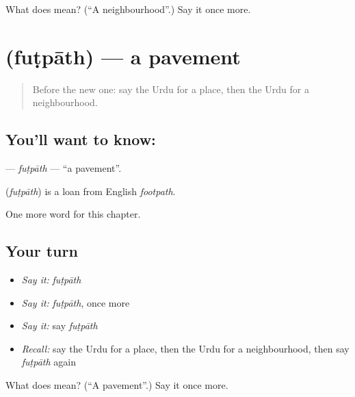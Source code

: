 \begin{tcolorbox}[breakable,colback=teal!4,colframe=teal!35!black,title={Before you move on}]
What does  mean? (\textquotedblleft{}A neighbourhood\textquotedblright{}.) Say it once more.
\end{tcolorbox}
\section[\texorpdfstring{\ur{فٹ} \ur{پاتھ} (fuṭpāth)}{فٹ پاتھ (fuṭpāth)}]{  (fuṭpāth) — a pavement}

\label{lesson:UR-C157-futpath}



\begin{quote}
Before the new one: say the Urdu for a place, then the Urdu for a neighbourhood.
\end{quote}

\subsection*{You'll want to know:  }
\textbf{ } — \emph{fuṭpāth} — \textquotedblleft{}a pavement\textquotedblright{}.

\begin{cousinweb}
\textbf{ } (\emph{fuṭpāth}) is a loan from English \emph{footpath}.
\end{cousinweb}

\begin{grammarlens}[title={What you've built}]
One more word for this chapter.
\end{grammarlens}

\subsection*{Your turn}
\begin{itemize}
\raggedright
  \item \emph{Say it:} \emph{fuṭpāth}
  \item \emph{Say it:} \emph{fuṭpāth}, once more
  \item \emph{Say it:} say \emph{fuṭpāth}
  \item \emph{Recall:} say the Urdu for a place, then the Urdu for a neighbourhood, then say \emph{fuṭpāth} again
\end{itemize}

\begin{tcolorbox}[breakable,colback=teal!4,colframe=teal!35!black,title={Before you move on}]
What does   mean? (\textquotedblleft{}A pavement\textquotedblright{}.) Say it once more.
\end{tcolorbox}
